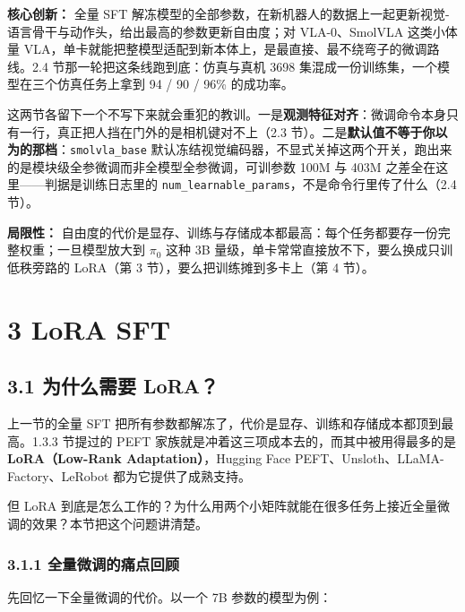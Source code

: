 \documentclass[
  chinese,
]{ctexart}
\begin{document}
\textbf{核心创新：} 全量 SFT
解冻模型的全部参数，在新机器人的数据上一起更新视觉-语言骨干与动作头，给出最高的参数更新自由度；对
VLA-0、SmolVLA 这类小体量
VLA，单卡就能把整模型适配到新本体上，是最直接、最不绕弯子的微调路线。2.4
节那一轮把这条线跑到底：仿真与真机 3698
集混成一份训练集，一个模型在三个仿真任务上拿到 94 / 90 / 96\% 的成功率。

这两节各留下一个不写下来就会重犯的教训。一是\textbf{观测特征对齐}：微调命令本身只有一行，真正把人挡在门外的是相机键对不上（2.3
节）。二是\textbf{默认值不等于你以为的那档}：\texttt{smolvla\_base}
默认冻结视觉编码器，不显式关掉这两个开关，跑出来的是模块级全参微调而非全模型全参微调，可训参数
100M 与 403M 之差全在这里------判据是训练日志里的
\texttt{num\_learnable\_params}，不是命令行里传了什么（2.4 节）。

\textbf{局限性：}
自由度的代价是显存、训练与存储成本都最高：每个任务都要存一份完整权重；一旦模型放大到
\(\pi_0\) 这种 3B 量级，单卡常常直接放不下，要么换成只训低秩旁路的
LoRA（第 3 节），要么把训练摊到多卡上（第 4 节）。

\section{3 LoRA SFT}\label{lora-sft}

\subsection{3.1 为什么需要
LoRA？}\label{ux4e3aux4ec0ux4e48ux9700ux8981-lora}

上一节的全量 SFT
把所有参数都解冻了，代价是显存、训练和存储成本都顶到最高。1.3.3 节提过的
PEFT 家族就是冲着这三项成本去的，而其中被用得最多的是
\textbf{LoRA（Low-Rank Adaptation）}，Hugging Face
PEFT、Unsloth、LLaMA-Factory、LeRobot 都为它提供了成熟支持。

但 LoRA
到底是怎么工作的？为什么用两个小矩阵就能在很多任务上接近全量微调的效果？本节把这个问题讲清楚。

\subsubsection{3.1.1
全量微调的痛点回顾}\label{ux5168ux91cfux5faeux8c03ux7684ux75dbux70b9ux56deux987e}

先回忆一下全量微调的代价。以一个 7B 参数的模型为例：
\end{document}
